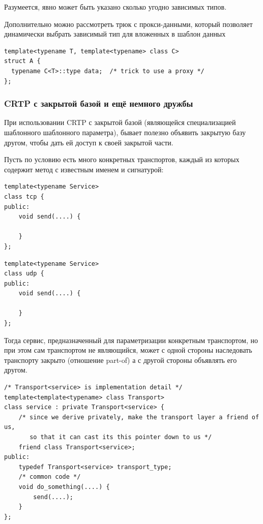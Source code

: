 \documentclass[a4paper,12pt,oneside]{article}
\begin{document}
Разумеется, явно может быть указано сколько угодно зависимых типов.

Дополнительно можно рассмотреть трюк с прокси-данными, который позволяет динамически выбрать зависимый тип для вложенных в шаблон данных

\begin{lstlisting}
template<typename T, template<typename> class C>
struct A {
  typename C<T>::type data;  /* trick to use a proxy */
};
\end{lstlisting}

\subsubsection{CRTP с закрытой базой и ещё немного дружбы}\label{ClosedCRTP}

При использовании CRTP с закрытой базой (являющейся специализацией шаблонного шаблонного параметра), бывает полезно объявить закрытую базу другом, чтобы дать ей доступ к своей закрытой части.

Пусть по условию есть много конкретных транспортов, каждый из которых содержит метод с известным именем и сигнатурой:

\begin{lstlisting}
template<typename Service>
class tcp {
public:
    void send(....) {

    }
};
\end{lstlisting}

\begin{lstlisting}
template<typename Service>
class udp {
public:
    void send(....) {

    }
};
\end{lstlisting}

Тогда сервис, предназначенный для параметризации конкретным транспортом, но при этом сам транспортом не являющийся, может с одной стороны наследовать транспорту закрыто (отношение part-of) а с другой стороны объявлять его другом.

\begin{lstlisting}
/* Transport<service> is implementation detail */
template<template<typename> class Transport>
class service : private Transport<service> {
    /* since we derive privately, make the transport layer a friend of us, 
       so that it can cast its this pointer down to us */
    friend class Transport<service>;
public:
    typedef Transport<service> transport_type;
    /* common code */
    void do_something(....) { 
        send(....);
    }
};
\end{lstlisting}
\end{document}
